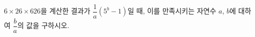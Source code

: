 $6\times26\times626$을 계산한 결과가 $\dfrac{1}{a}(5^b-1)$일 때, 이를 만족시키는 자연수 $a$, $b$에 대하여 $\dfrac{b}{a}$의 값을 구하시오.
